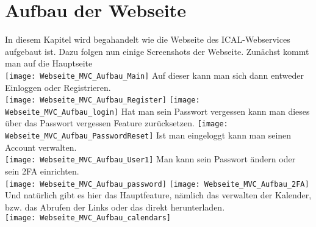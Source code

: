 {\section{Aufbau der Webseite }
\label{sec:aufbau}
In diesem Kapitel wird begahandelt wie die Webseite des ICAL-Webservices aufgebaut ist. Dazu folgen nun einige Screenshots der Webseite.
Zunächst kommt man auf die Hauptseite\\
\texttt{[image: Webseite\_MVC\_Aufbau\_Main]}
Auf dieser kann man sich dann entweder Einloggen oder Registrieren.\\
\texttt{[image: Webseite\_MVC\_Aufbau\_Register]}
\texttt{[image: Webseite\_MVC\_Aufbau\_login]}
Hat man sein Passwort vergessen kann man dieses über das Passwort vergessen Feature zurücksetzen. 
\texttt{[image: Webseite\_MVC\_Aufbau\_PasswordReset]}
Ist man eingeloggt kann man seinen Account verwalten.\\
\texttt{[image: Webseite\_MVC\_Aufbau\_User1]}
Man kann sein Passwort ändern oder sein 2FA einrichten. \\
\texttt{[image: Webseite\_MVC\_Aufbau\_password]}
\texttt{[image: Webseite\_MVC\_Aufbau\_2FA]}
Und natürlich gibt es hier das Hauptfeature, nämlich das verwalten der Kalender, bzw. das Abrufen der Links oder das direkt herunterladen.\\
\texttt{[image: Webseite\_MVC\_Aufbau\_calendars]}
}
